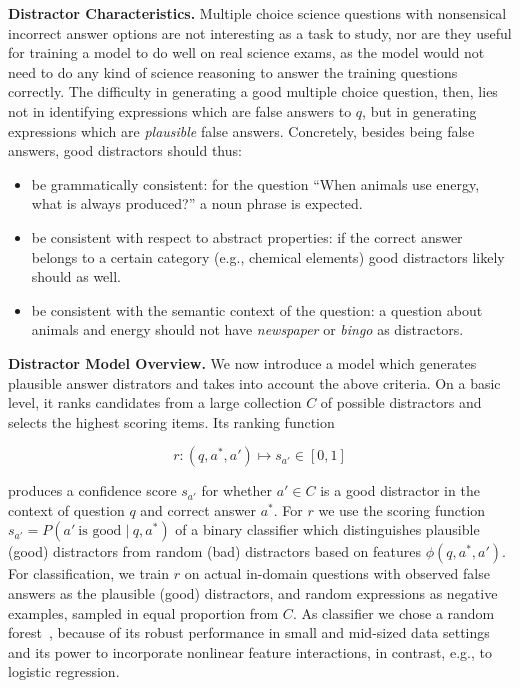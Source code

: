 \textbf{Distractor Characteristics.} Multiple choice science questions with nonsensical incorrect answer options are not interesting as a task to study, nor are they useful for training a model to do well on real science exams, as the model would not need to do any kind of science reasoning to answer the training questions correctly.  The difficulty in generating a good multiple choice question, then, lies not in identifying expressions which are false answers to $q$, but in generating expressions which are \emph{plausible} false answers. Concretely, besides being false answers, good distractors should thus:

\begin{itemize}
    \itemsep0em \item be grammatically consistent: for the question ``When animals use energy, what is always produced?'' a noun phrase is expected.
    \item be consistent with respect to abstract properties: if the correct answer belongs to a certain category (e.g., chemical elements) good distractors likely should as well.
    \item be consistent with the semantic context of the question: a question about animals and energy should not have \emph{newspaper} or \emph{bingo} as distractors.
\end{itemize}

\textbf{Distractor Model Overview.} We now introduce a model which generates plausible answer distrators and takes into account the above criteria. On a basic level, it ranks candidates from a large collection $C$ of possible distractors and selects the highest scoring items. Its ranking function

\begin{equation}
r: (q,a^*,a') \mapsto s_{a'} \in [0,1]
\end{equation}

produces a confidence score $s_{a'}$ for whether $a' \in C$ is a good distractor in the context of question $q$ and correct answer $a^*$. For $r$ we use the scoring function $s_{a'} = P(a'\ \text{is good } |~q,a^*)$ of a binary classifier which distinguishes plausible (good) distractors from random (bad) distractors based on features $\phi(q,a^*,a')$. 
For classification, we train $r$ on actual in-domain questions with observed false answers as the plausible (good) distractors, and random expressions as negative examples, sampled in equal proportion from $C$. As classifier we chose a random forest~\cite{Breiman2001Random}, because of its robust performance in small and mid-sized data settings and its power to incorporate nonlinear feature interactions, in contrast, e.g., to logistic regression.

